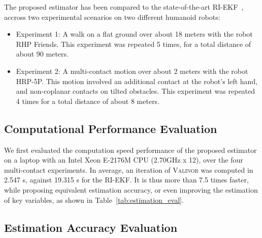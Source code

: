 \documentclass[10pt,twocolumn]{ICCAS}
\begin{document}
The proposed estimator has been compared to the state-of-the-art RI-EKF~\cite{Hartley2020RIEKF}, accross two experimental scenarios on two different humanoid robots:
\begin{itemize}
    \item Experiment 1: A walk on a flat ground over about 18 meters with the robot RHP Friends. This experiment was repeated 5 times, for a total distance of about 90 meters.
    \item Experiment 2: A multi-contact motion over about 2 meters with the robot HRP-5P. This motion involved an additional contact at the robot's left hand, and non-coplanar contacts on tilted obstacles. This experiment was repeated 4 times for a total distance of about 8 meters.
\end{itemize}
\subsection{Computational Performance Evaluation}\label{subsec:computation_time}

We first evaluated the computation speed performance of the proposed estimator on a laptop with an Intel Xeon E-2176M CPU (2.70GHz x 12), over the four multi-contact experiments. In average, an iteration of {\scshape Valinor} was computed in 2.547 \textmu s, against 19.315 \textmu s for the RI-EKF. It is thus more than 7.5 times faster, while proposing equivalent estimation accuracy, or even improving the estimation of key variables, as shown in Table~\ref{tab:estimation_eval}.

\subsection{Estimation Accuracy Evaluation} ~\label{subsec:est_accur_eval}
\end{document}
